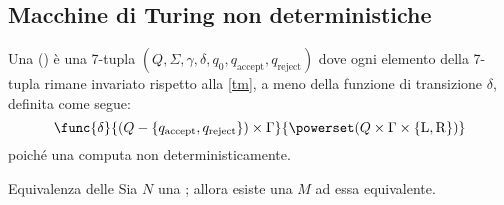 \documentclass[a4paper, 12pt]{report}
\begin{document}
    \subsection{Macchine di Turing non deterministiche}

    \begin{frameddefn}{\NTM}
        Una \tbf{\NTM} () è una 7-tupla $(Q, \Sigma, \gamma, \delta, q_0, q_\mathrm{accept}, q_\mathrm{reject})$ dove ogni elemento della 7-tupla rimane invariato rispetto alla \cref{tm}, a meno della funzione di transizione $\delta$, definita come segue: $$\func{\delta}{(Q-\{q_\mathrm{accept}, q_\mathrm{reject}\}) \times \Gamma}{\powerset(Q \times \Gamma \times \{ \mathrm L, \mathrm R\})}$$ poiché una \NTM computa non deterministicamente.
    \end{frameddefn}

    \begin{framedprop}[label={ntm tm}]{Equivalenza delle \NTM}
        Sia $N$ una \NTM; allora esiste una \TM $M$ ad essa equivalente.
    \end{framedprop}
\end{document}
